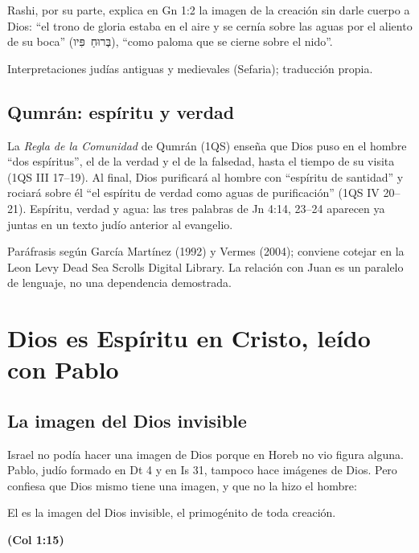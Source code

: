 \documentclass[11pt,letterpaper]{article}
\newcommand{\heb}[1]{\mbox{\foreignlanguage{hebrew}{#1}}}
\newcommand{\fuente}[1]{\par\hfill{\upshape\bfseries\small\textcolor{azul}{#1}}}
\begin{document}
Rashi, por su parte, explica en Gn 1:2 la imagen de la creación sin darle cuerpo a Dios: ``el trono de gloria estaba en el aire y se cernía sobre las aguas por el aliento de su boca'' (\heb{בְּרוּחַ פִּיו}), ``como paloma que se cierne sobre el nido''.

\begin{nota}[Precisión]
Interpretaciones judías antiguas y medievales (Sefaria); traducción propia.
\end{nota}

\subsection{Qumrán: espíritu y verdad}

La \emph{Regla de la Comunidad} de Qumrán (1QS) enseña que Dios puso en el hombre ``dos espíritus'', el de la verdad y el de la falsedad, hasta el tiempo de su visita (1QS III 17--19). Al final, Dios purificará al hombre con ``espíritu de santidad'' y rociará sobre él ``el espíritu de verdad como aguas de purificación'' (1QS IV 20--21). Espíritu, verdad y agua: las tres palabras de Jn 4:14, 23--24 aparecen ya juntas en un texto judío anterior al evangelio.

\begin{nota}[Precisión]
Paráfrasis según García Martínez (1992) y Vermes (2004); conviene cotejar en la Leon Levy Dead Sea Scrolls Digital Library. La relación con Juan es un paralelo de lenguaje, no una dependencia demostrada.
\end{nota}

\section{Dios es Espíritu en Cristo, leído con Pablo}\label{sec:cristo-esp}

\subsection{La imagen del Dios invisible}

Israel no podía hacer una imagen de Dios porque en Horeb no vio figura alguna. Pablo, judío formado en Dt 4 y en Is 31, tampoco hace imágenes de Dios. Pero confiesa que Dios mismo tiene una imagen, y que no la hizo el hombre:

\begin{cita}El es la imagen del Dios invisible, el primogénito de toda creación.\fuente{(Col 1:15)}\end{cita}
\end{document}
